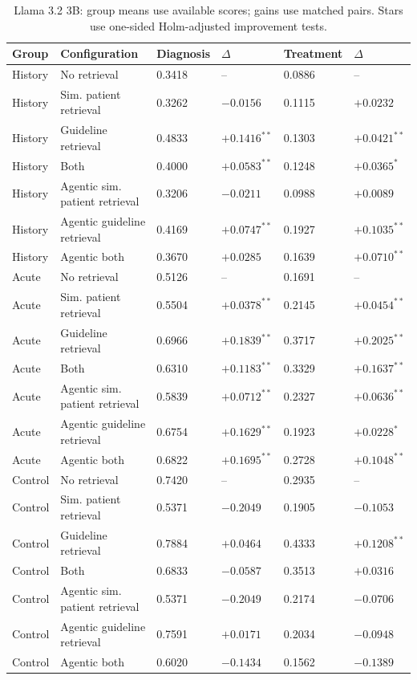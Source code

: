 \begin{table}[t]
\centering
\scriptsize
\begin{tabular}{llllll}
\toprule
Group & Configuration & Diagnosis & $\Delta$ & Treatment & $\Delta$ \\
\midrule
History & No retrieval & 0.3418 & -- & 0.0886 & -- \\
History & Sim. patient retrieval & 0.3262 & $-0.0156$ & 0.1115 & $+0.0232$ \\
History & Guideline retrieval & 0.4833 & $+0.1416^{**}$ & 0.1303 & $+0.0421^{**}$ \\
History & Both & 0.4000 & $+0.0583^{**}$ & 0.1248 & $+0.0365^{*}$ \\
History & Agentic sim. patient retrieval & 0.3206 & $-0.0211$ & 0.0988 & $+0.0089$ \\
History & Agentic guideline retrieval & 0.4169 & $+0.0747^{**}$ & 0.1927 & $+0.1035^{**}$ \\
History & Agentic both & 0.3670 & $+0.0285$ & 0.1639 & $+0.0710^{**}$ \\
\midrule
Acute & No retrieval & 0.5126 & -- & 0.1691 & -- \\
Acute & Sim. patient retrieval & 0.5504 & $+0.0378^{**}$ & 0.2145 & $+0.0454^{**}$ \\
Acute & Guideline retrieval & 0.6966 & $+0.1839^{**}$ & 0.3717 & $+0.2025^{**}$ \\
Acute & Both & 0.6310 & $+0.1183^{**}$ & 0.3329 & $+0.1637^{**}$ \\
Acute & Agentic sim. patient retrieval & 0.5839 & $+0.0712^{**}$ & 0.2327 & $+0.0636^{**}$ \\
Acute & Agentic guideline retrieval & 0.6754 & $+0.1629^{**}$ & 0.1923 & $+0.0228^{*}$ \\
Acute & Agentic both & 0.6822 & $+0.1695^{**}$ & 0.2728 & $+0.1048^{**}$ \\
\midrule
Control & No retrieval & 0.7420 & -- & 0.2935 & -- \\
Control & Sim. patient retrieval & 0.5371 & $-0.2049$ & 0.1905 & $-0.1053$ \\
Control & Guideline retrieval & 0.7884 & $+0.0464$ & 0.4333 & $+0.1208^{**}$ \\
Control & Both & 0.6833 & $-0.0587$ & 0.3513 & $+0.0316$ \\
Control & Agentic sim. patient retrieval & 0.5371 & $-0.2049$ & 0.2174 & $-0.0706$ \\
Control & Agentic guideline retrieval & 0.7591 & $+0.0171$ & 0.2034 & $-0.0948$ \\
Control & Agentic both & 0.6020 & $-0.1434$ & 0.1562 & $-0.1389$ \\
\midrule
\bottomrule
\end{tabular}
\caption{Llama 3.2 3B: group means use available scores; gains use matched pairs. Stars use one-sided Holm-adjusted improvement tests.}
\end{table}
